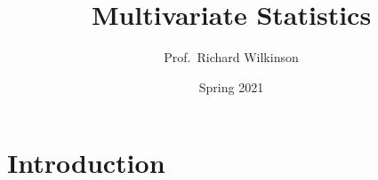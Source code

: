\documentclass[]{book}
\title{Multivariate Statistics}
\author{Prof.~Richard Wilkinson}
\date{Spring 2021}
\theoremstyle{definition}
\theoremstyle{definition}
\theoremstyle{definition}
\theoremstyle{remark}
\begin{document}
\maketitle

{
\setcounter{tocdepth}{1}
\tableofcontents
}
\hypertarget{introduction}{%
\chapter*{Introduction}\label{introduction}}

\newcommand{\bmu}{{\boldsymbol{\mu}}}
\newcommand{\bSigma}{\boldsymbol{\Sigma}}
\newcommand{\bLambda}{\boldsymbol \Lambda}
\newcommand{\bgamma}{\boldsymbol \gamma}
\newcommand{\btheta}{\boldsymbol \theta}
\newcommand{\bdelta}{\boldsymbol \delta}
\newcommand{\bbeta}{\boldsymbol \beta}
\newcommand{\blambda}{\boldsymbol \lambda}

\newcommand{\bA}{\mathbf A}
\newcommand{\bB}{\mathbf B}
\newcommand{\bC}{\mathbf C}
\newcommand{\bD}{\mathbf D}
\newcommand{\bE}{\mathbf E}
\newcommand{\bF}{\mathbf F}
\newcommand{\bG}{\mathbf G}
\newcommand{\bH}{\mathbf H}
\newcommand{\bI}{\mathbf I}
\newcommand{\bM}{\mathbf M}
\newcommand{\bP}{\mathbf P}
\newcommand{\bQ}{\mathbf Q}
\newcommand{\bR}{\mathbf R}
\newcommand{\mR}{\mathbb R}
\newcommand{\bS}{\mathbf S}
\newcommand{\bT}{\mathbf T}
\newcommand{\bV}{\mathbf V}
\newcommand{\bU}{\mathbf U}
\newcommand{\bW}{\mathbf W}
\newcommand{\bX}{\mathbf X}
\newcommand{\bY}{\mathbf Y}
\newcommand{\bZ}{\mathbf Z}

\newcommand{\ba}{\mathbf a}
\newcommand{\bb}{\mathbf b}
\newcommand{\bc}{\mathbf c}
\newcommand{\bd}{\mathbf d}
\newcommand{\be}{\mathbf e}
\newcommand{\bh}{\mathbf h}
\newcommand{\bk}{\mathbf k}
\newcommand{\bp}{\mathbf p}
\newcommand{\bq}{\mathbf q}
\newcommand{\br}{\mathbf r}
\newcommand{\bt}{{\mathbf t}}
\newcommand{\bu}{\mathbf u}
\newcommand{\bv}{\mathbf v}
\newcommand{\bw}{\mathbf w}
\newcommand{\bx}{\mathbf x}
\newcommand{\by}{\mathbf y}
\newcommand{\bz}{\mathbf z}

\newcommand{\bzero}{\boldsymbol 0}

\newcommand{\cR}{\mathcal R}

\newcommand{\bs}{\boldsymbol}
\newcommand{\ds}{\displaystyle}
\newcommand{\tdiag}{\text{diag}}
\newcommand{\ttr}{\text{tr}}
\newcommand{\tmin}{\text{min}}
\newcommand{\tmax}{\text{max}}
\newcommand{\tdet}{\text{det}}
\newcommand{\tr}{\operatorname{tr}}
\newcommand{\indep}{\perp \!\!\! \perp}
\end{document}
